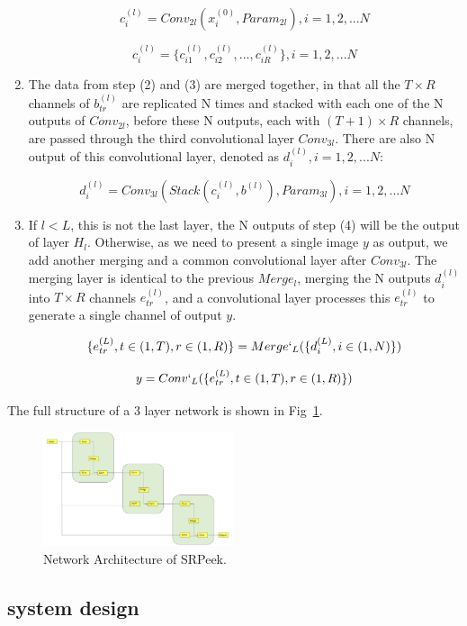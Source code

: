 \begin{enumerate}
$$ c_i^{(l)} = Conv_{2l}(x_i^{(0)},Param_{2l}), i=1,2,...N$$

$$ c_i^{(l)} = \{c_{i1}^{(l)},c_{i2}^{(l)},...,c_{iR}^{(l)}\}, i=1,2,...N$$

\item The data from step (2) and (3) are merged together, in that all the $T\times R$ channels of $b_{tr}^{(l)}$ are replicated N times and stacked with each one of the N outputs of $Conv_{2l}$, before these N outputs, each with $(T+1)\times R$ channels, are passed through the third convolutional layer $Conv_{3l}$. There are also N output of this convolutional layer, denoted as $d_i^{(l)}, i=1,2,...N$:

$$ d_i^{(l)} = Conv_{3l}(Stack(c_i^{(l)},b^{(l)}),Param_{3l}), i=1,2,...N $$

\item If $l < L$, this is not the last layer, the N outputs of step (4) will be the output of layer $H_l$. Otherwise, as we need to present a single image $y$ as output, we add another merging and a common convolutional layer after $Conv_{3l}$. The merging layer is identical to the previous $Merge_l$, merging the N outputs $d_i^{(l)}$ into $T\times R$ channels $e_{tr}^{(l)}$, and a convolutional layer processes this $e_{tr}^{(l)}$ to generate a single channel of output $y$. 


$$ \{e_{tr}^{(L)},t\in (1,T),r\in (1,R)\} = Merge`_{L}(\{d_i^{(L)},i\in (1,N)\})$$


$$ y = Conv`_{L}(\{e_{tr}^{(L)},t\in (1,T),r\in (1,R)\})$$


\end{enumerate}

The full structure of a 3 layer network is shown in Fig~\ref{fig-system}.

\begin{figure}
 \centering
    \includegraphics[width=0.5\textwidth]{./pic/design.pdf}
    \caption{Network Architecture of SRPeek.}
    \label{fig-system}
\end{figure}

\subsection{system design}


